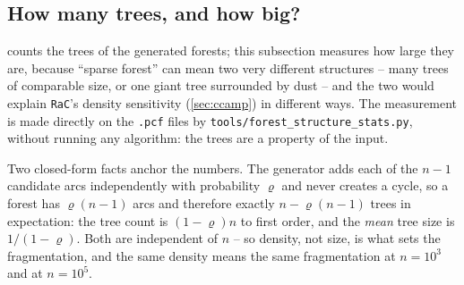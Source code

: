 \documentclass[11pt]{article}
\begin{document}
\subsection{How many trees, and how big?}\label{sec:forestsize}

 counts the trees of the generated forests; this subsection
measures how large they are, because ``sparse forest'' can mean two very
different structures -- many trees of comparable size, or one giant tree
surrounded by dust -- and the two would explain \texttt{RaC}'s density
sensitivity (\cref{sec:ccamp}) in different ways. The measurement is made
directly on the \texttt{.pcf} files by \texttt{tools/forest\_structure\_stats.py},
without running any algorithm: the trees are a property of the input.

Two closed-form facts anchor the numbers. The generator adds each of the $n-1$
candidate arcs independently with probability $\varrho$ and never creates a
cycle, so a forest has $\varrho(n-1)$ arcs and therefore exactly
$n-\varrho(n-1)$ trees in expectation: the tree count is $(1-\varrho)n$ to
first order, and the \emph{mean} tree size is $1/(1-\varrho)$. Both are
independent of $n$ -- so density, not size, is what sets the fragmentation, and
the same density means the same fragmentation at $n=10^3$ and at $n=10^5$.
\end{document}
